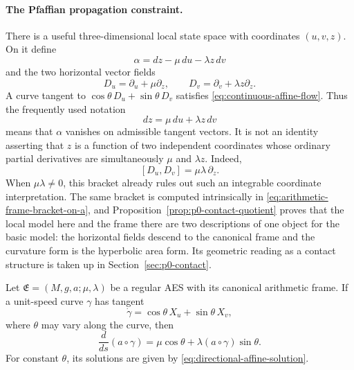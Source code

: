 \paragraph{The Pfaffian propagation constraint.}
There is a useful three-dimensional local state space with coordinates
$(u,v,z)$.  On it define
\begin{equation}\label{eq:affine-pfaffian-form}
 \alpha=dz-\mu\,du-\lambda z\,dv
\end{equation}
and the two horizontal vector fields
\begin{equation}\label{eq:affine-horizontal-fields}
 D_u=\partial_u+\mu\partial_z,
 \qquad
 D_v=\partial_v+\lambda z\partial_z.
\end{equation}
A curve tangent to
$\cos\theta\,D_u+\sin\theta\,D_v$ satisfies
\eqref{eq:continuous-affine-flow}.  Thus the frequently used notation
\[
 dz=\mu\,du+\lambda z\,dv
\]
means that $\alpha$ vanishes on admissible tangent vectors.  It is not an
identity asserting that $z$ is a function of two independent coordinates whose
ordinary partial derivatives are simultaneously $\mu$ and $\lambda z$.
Indeed,
\begin{equation}\label{eq:horizontal-noncommutation}
 [D_u,D_v]=\mu\lambda\,\partial_z.
\end{equation}
When $\mu\lambda\ne0$, this bracket already rules out such an integrable
coordinate interpretation.  The same bracket is computed intrinsically in
\eqref{eq:arithmetic-frame-bracket-on-a}, and
Proposition~\ref{prop:p0-contact-quotient} proves that the local model here and
the frame there are two descriptions of one object for the basic model: the
horizontal fields descend to the canonical frame and the curvature form is the
hyperbolic area form.  Its geometric reading as a contact structure is
taken up in Section~\ref{sec:p0-contact}.

\begin{theorem}\label{thm:continuous-affine-flow}
Let $\mathfrak E=(M,g,a;\mu,\lambda)$ be a regular AES with its canonical
arithmetic frame.  If a unit-speed curve $\gamma$ has tangent
\[
 \dot\gamma
 =\cos\theta\,X_u+\sin\theta\,X_v,
\]
where $\theta$ may vary along the curve, then
\begin{equation}\label{eq:intrinsic-continuous-affine-flow}
 \frac{d}{ds}(a\circ\gamma)
 =\mu\cos\theta+\lambda(a\circ\gamma)\sin\theta.
\end{equation}
For constant $\theta$, its solutions are given by \eqref{eq:directional-affine-solution}.
\end{theorem}


